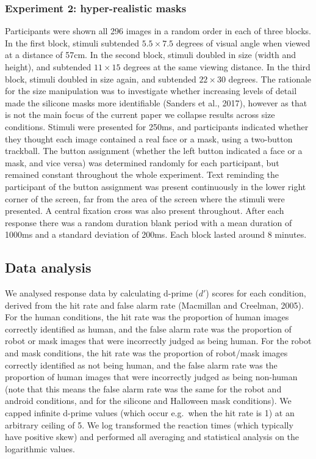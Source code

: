 \documentclass[
]{article}
\begin{document}
\hypertarget{experiment-2-hyper-realistic-masks}{%
\subsubsection{Experiment 2: hyper-realistic masks}\label{experiment-2-hyper-realistic-masks}}

Participants were shown all 296 images in a random order in each of three blocks. In the first block, stimuli subtended \(5.5\times7.5\) degrees of visual angle when viewed at a distance of 57cm. In the second block, stimuli doubled in size (width and height), and subtended \(11\times15\) degrees at the same viewing distance. In the third block, stimuli doubled in size again, and subtended \(22\times30\) degrees. The rationale for the size manipulation was to investigate whether increasing levels of detail made the silicone masks more identifiable (Sanders et al., 2017), however as that is not the main focus of the current paper we collapse results across size conditions. Stimuli were presented for 250ms, and participants indicated whether they thought each image contained a real face or a mask, using a two-button trackball. The button assignment (whether the left button indicated a face or a mask, and vice versa) was determined randomly for each participant, but remained constant throughout the whole experiment. Text reminding the participant of the button assignment was present continuously in the lower right corner of the screen, far from the area of the screen where the stimuli were presented. A central fixation cross was also present throughout. After each response there was a random duration blank period with a mean duration of 1000ms and a standard deviation of 200ms. Each block lasted around 8 minutes.

\hypertarget{data-analysis}{%
\subsection{Data analysis}\label{data-analysis}}

We analysed response data by calculating d-prime (\(d'\)) scores for each condition, derived from the hit rate and false alarm rate (Macmillan and Creelman, 2005). For the human conditions, the hit rate was the proportion of human images correctly identified as human, and the false alarm rate was the proportion of robot or mask images that were incorrectly judged as being human. For the robot and mask conditions, the hit rate was the proportion of robot/mask images correctly identified as not being human, and the false alarm rate was the proportion of human images that were incorrectly judged as being non-human (note that this means the false alarm rate was the same for the robot and android conditions, and for the silicone and Halloween mask conditions). We capped infinite d-prime values (which occur e.g.~when the hit rate is 1) at an arbitrary ceiling of 5. We log transformed the reaction times (which typically have positive skew) and performed all averaging and statistical analysis on the logarithmic values.
\end{document}

